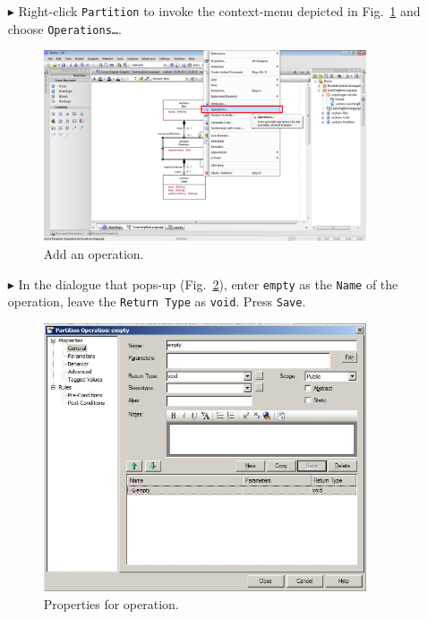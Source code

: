 \begin{enumerate}
\item[$\blacktriangleright$] Right-click \texttt{Partition} to invoke the context-menu depicted in Fig.~\ref{fig:add_operation} and choose \texttt{Operations\ldots}.

\begin{figure}[htbp]
	\centering
  \includegraphics[width=0.9\textwidth]{pics/memBoxBilder/memBox35.png}
	\caption{Add an operation.}
	\label{fig:add_operation}
\end{figure}
 
\item[$\blacktriangleright$] In the dialogue that pops-up (Fig.~\ref{fig:operation_properties}), enter \texttt{empty} as the \texttt{Name} of the operation, leave the \texttt{Return Type} as \texttt{void}.  Press \texttt{Save}.
 
\begin{figure}[htbp]
	\centering
  	\includegraphics[width=0.9\textwidth]{pics/memBoxBilder/memBox37.png}
	\caption{Properties for operation.}
	\label{fig:operation_properties}
\end{figure}


\end{enumerate}
